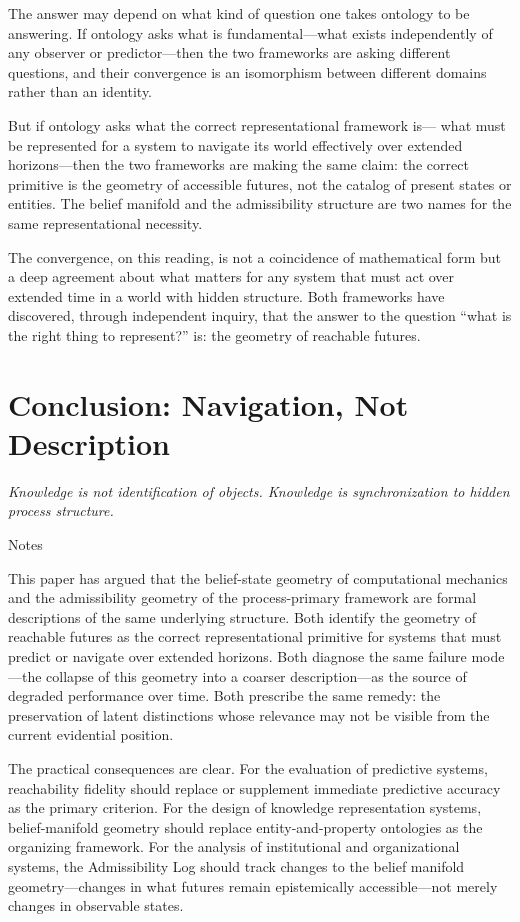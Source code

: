 \documentclass[12pt, a4paper]{article}
\theoremstyle{plain}
\theoremstyle{definition}
\theoremstyle{remark}
\begin{document}
The answer may depend on what kind of question one takes ontology to be
answering. If ontology asks what is fundamental---what exists
independently of any observer or predictor---then the two frameworks
are asking different questions, and their convergence is an isomorphism
between different domains rather than an identity.

But if ontology asks what the correct representational framework is---
what must be represented for a system to navigate its world effectively
over extended horizons---then the two frameworks are making the same
claim: the correct primitive is the geometry of accessible futures,
not the catalog of present states or entities. The belief manifold and
the admissibility structure are two names for the same representational
necessity.

The convergence, on this reading, is not a coincidence of mathematical
form but a deep agreement about what matters for any system that must
act over extended time in a world with hidden structure. Both frameworks
have discovered, through independent inquiry, that the answer to the
question ``what is the right thing to represent?'' is: the geometry of
reachable futures.

\section{Conclusion: Navigation, Not Description}

\epigraph{\textit{Knowledge is not identification of objects.
Knowledge is synchronization to hidden process structure.}}{Notes}

\noindent
This paper has argued that the belief-state geometry of computational
mechanics and the admissibility geometry of the process-primary framework
are formal descriptions of the same underlying structure. Both identify
the geometry of reachable futures as the correct representational primitive
for systems that must predict or navigate over extended horizons. Both
diagnose the same failure mode---the collapse of this geometry into a
coarser description---as the source of degraded performance over time.
Both prescribe the same remedy: the preservation of latent distinctions
whose relevance may not be visible from the current evidential position.

The practical consequences are clear. For the evaluation of predictive
systems, reachability fidelity should replace or supplement immediate
predictive accuracy as the primary criterion. For the design of knowledge
representation systems, belief-manifold geometry should replace
entity-and-property ontologies as the organizing framework. For the
analysis of institutional and organizational systems, the Admissibility
Log should track changes to the belief manifold geometry---changes in
what futures remain epistemically accessible---not merely changes in
observable states.
\end{document}
